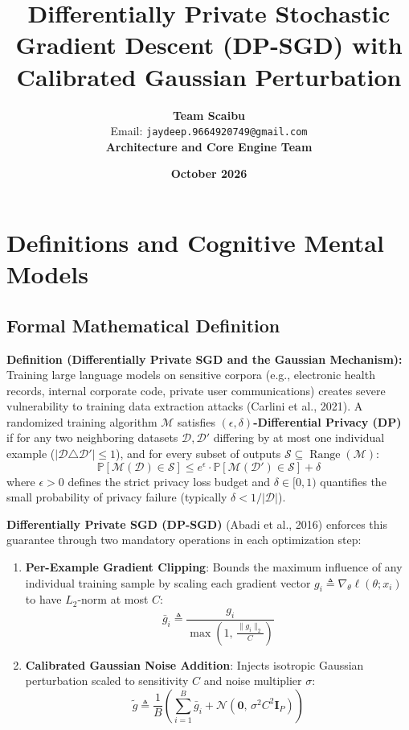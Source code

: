 \documentclass[11pt,a4paper]{article}
\title{\textbf{Differentially Private Stochastic Gradient Descent (DP-SGD) with Calibrated Gaussian Perturbation}}
\author{\textbf{Team Scaibu} \\ \small Email: \texttt{jaydeep.9664920749@gmail.com} \\ \small \textbf{Architecture and Core Engine Team}}
\date{\textbf{October 2026}}
\theoremstyle{definition}
\begin{document}
\maketitle

\section{Definitions and Cognitive Mental Models}

\subsection{Formal Mathematical Definition}
\textbf{Definition (Differentially Private SGD and the Gaussian Mechanism):}
Training large language models on sensitive corpora (e.g., electronic health records, internal corporate code, private user communications) creates severe vulnerability to training data extraction attacks (Carlini et al., 2021). A randomized training algorithm $\mathcal{M}$ satisfies \textbf{$(\epsilon, \delta)$-Differential Privacy (DP)} if for any two neighboring datasets $\mathcal{D}, \mathcal{D}'$ differing by at most one individual example ($|\mathcal{D} \triangle \mathcal{D}'| \le 1$), and for every subset of outputs $\mathcal{S} \subseteq \operatorname{Range}(\mathcal{M})$:
{\boldmath
\begin{equation}
\mathbb{P}\left[ \mathcal{M}(\mathcal{D}) \in \mathcal{S} \right] \le e^{\epsilon} \cdot \mathbb{P}\left[ \mathcal{M}(\mathcal{D}') \in \mathcal{S} \right] + \delta
\end{equation}
}
where $\epsilon > 0$ defines the strict privacy loss budget and $\delta \in [0, 1)$ quantifies the small probability of privacy failure (typically $\delta < 1/|\mathcal{D}|$).

\textbf{Differentially Private SGD (DP-SGD)} (Abadi et al., 2016) enforces this guarantee through two mandatory operations in each optimization step:
\begin{enumerate}
    \item \textbf{Per-Example Gradient Clipping}: Bounds the maximum influence of any individual training sample by scaling each gradient vector $g_i \triangleq \nabla_\theta \ell(\theta; x_i)$ to have $L_2$-norm at most $C$:
    {\boldmath
    \begin{equation}
    \bar{g}_i \triangleq \frac{g_i}{\max\left( 1, \, \frac{\|g_i\|_2}{C} \right)}
    \end{equation}
    }
    \item \textbf{Calibrated Gaussian Noise Addition}: Injects isotropic Gaussian perturbation scaled to sensitivity $C$ and noise multiplier $\sigma$:
    {\boldmath
    \begin{equation}
    \tilde{g} \triangleq \frac{1}{B} \left( \sum_{i=1}^B \bar{g}_i + \mathcal{N}\left( \mathbf{0}, \, \sigma^2 C^2 \mathbf{I}_P \right) \right)
    \end{equation}
    }
\end{enumerate}
\end{document}
